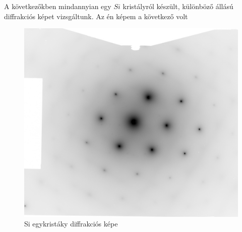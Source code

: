\documentclass[a4paper,12pt]{article}
\begin{document}
\vspace{5mm}

\par A következőkben mindannyian egy $Si$ kristályról készült, különböző állású diffrakciós képet vizsgáltunk. Az én képem a következő volt

\vspace{5mm}

\begin{figure}[!htb]
\centering
\includegraphics[width=0.45\linewidth]{./Si_Olar.jpg}
\caption{ Si egykristáky diffrakciós képe }
\end{figure}
\end{document}
